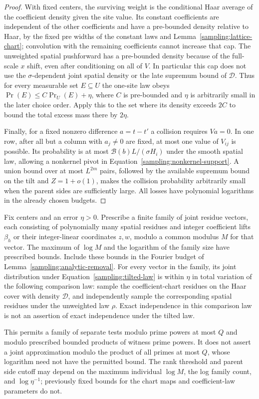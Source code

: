 \begin{proof}
With fixed centers, the surviving weight is the conditional Haar average
of the coefficient density given the site value.  Its constant coefficients
are independent of the other coefficients and have a pre-bounded density
relative to Haar, by the fixed pre widths of the constant laws and
Lemma~\ref{sampling:lattice-chart}; convolution with
the remaining coefficients cannot increase that cap.  The unweighted
spatial pushforward has a pre-bounded density because of the full-scale
$x$ shift, even after conditioning on all of $V$.  In particular this cap
does not use the $\sigma$-dependent joint spatial density or the late
supremum bound of $\mathcal D$.  Thus for every measurable set $E\subseteq U$ the one-site law
obeys $\Pr(E)\le C\Pr_U(E)+\eta$, where $C$ is pre-bounded and $\eta$
is arbitrarily small in the later choice order.  Apply this to the set
where its density exceeds $2C$ to bound the total excess mass there by
$2\eta$.

Finally, for a fixed nonzero difference $a=t-t'$ a collision requires
$Va=0$.  In one row, after all but a column with $a_j\ne0$ are fixed,
at most one value of $V_{ij}$ is possible.  Its probability is at most
$\mathcal B(b)L/(\sigma H_i)$ under the smooth spatial law, allowing a
nonkernel pivot in Equation~\eqref{sampling:nonkernel-support}.  A union bound over
at most $L^{2m}$ pairs, followed by the available supremum bound on the
tilt and $Z=1+o(1)$, makes the collision probability arbitrarily small
when the parent sides are sufficiently large.  All losses have polynomial
logarithms in the already chosen budgets.
\end{proof}

\begin{corollary}
\label{sampling:finite-residues}
Fix centers and an error $\eta>0$.  Prescribe a finite family of joint
residue vectors, each consisting of polynomially many spatial residues
and integer coefficient lifts $\beta_h$ or their integer-linear
coordinates $z,w$, modulo a common modulus $M$ for that vector.
The maximum of $\log M$ and the logarithm of the family size have prescribed
bounds.  Include these bounds in the Fourier budget of
Lemma~\ref{sampling:analytic-removal}.
For every vector in the family, its joint distribution under
Equation~\eqref{sampling:tilted-law} is within $\eta$ in total variation
of the following comparison law: sample the coefficient-chart residues
on the Haar cover with density $\mathcal D$, and independently sample
the corresponding spatial residues under the unweighted law $\rho$.
Exact independence in this comparison law is not an assertion of exact
independence under the tilted law.

This permits a family of separate tests modulo prime powers at most $Q$
and modulo prescribed bounded products of witness prime powers.
It does not assert a joint approximation modulo the product of all primes
at most $Q$, whose logarithm need not have the permitted bound.
The rank threshold and parent side cutoff may depend on the maximum
individual $\log M$, the log family count, and $\log\eta^{-1}$;
previously fixed bounds for the chart maps and coefficient-law parameters
do not.
\end{corollary}


